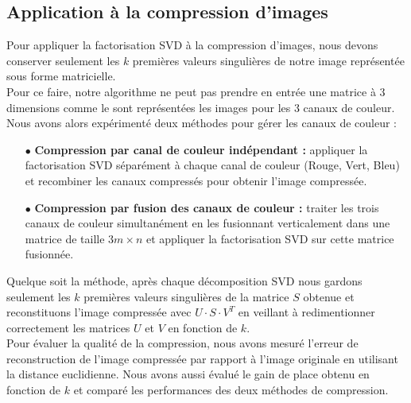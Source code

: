 \documentclass{article}
\begin{document}
\subsection{Application à la compression d'images}
Pour appliquer la factorisation SVD à la compression d'images, nous devons conserver seulement les \( k \) premières valeurs singulières de notre image représentée sous forme matricielle.\\
Pour ce faire, notre algorithme ne peut pas prendre en entrée une matrice à 3 dimensions comme le sont représentées les images pour les 3 canaux de couleur. Nous avons alors expérimenté deux méthodes pour gérer les canaux de couleur :
\vspace{0.3cm}
\begin{itemize}
  \item[$\bullet$] \textbf{Compression par canal de couleur indépendant : } appliquer la factorisation SVD séparément à chaque canal de couleur (Rouge, Vert, Bleu) et recombiner les canaux compressés pour obtenir l'image compressée.
  \item[$\bullet$] \textbf{Compression par fusion des canaux de couleur : } traiter les trois canaux de couleur simultanément en les fusionnant verticalement dans une matrice de taille \( 3m \times n \) et appliquer la factorisation SVD sur cette matrice fusionnée.
\end{itemize}
\vspace{0.3cm}
\noindent Quelque soit la méthode, après chaque décomposition SVD nous gardons seulement les \( k \) premières valeurs singulières de la matrice \( S \) obtenue et reconstituons l'image compressée avec \( U \cdot S \cdot V^T \) en veillant à redimentionner correctement les matrices \( U \) et \( V \) en fonction de \( k \).\\
Pour évaluer la qualité de la compression, nous avons mesuré l'erreur de reconstruction de l'image compressée par rapport à l'image originale en utilisant la distance euclidienne. Nous avons aussi évalué le gain de place obtenu en fonction de \( k \) et comparé les performances des deux méthodes de compression.
\\
\end{document}
